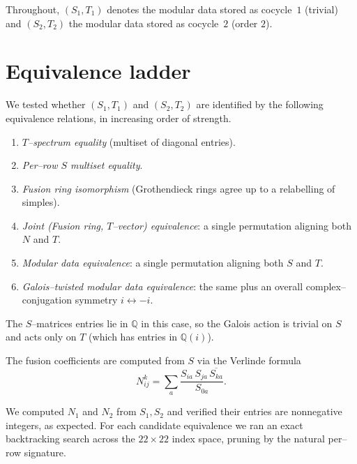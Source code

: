 \documentclass[11pt,a4paper]{amsart}
\theoremstyle{plain}
\theoremstyle{definition}
\begin{document}
Throughout, $(S_1,T_1)$ denotes the modular data stored as cocycle~$1$
(trivial) and $(S_2,T_2)$ the modular data stored as cocycle~$2$ (order
$2$).

\section{Equivalence ladder}

We tested whether $(S_1,T_1)$ and $(S_2,T_2)$ are identified by the
following equivalence relations, in increasing order of strength.

\begin{enumerate}
\item \emph{$T$--spectrum equality} (multiset of diagonal entries).
\item \emph{Per--row $S$ multiset equality}.
\item \emph{Fusion ring isomorphism} (Grothendieck rings agree up to a
       relabelling of simples).
\item \emph{Joint (Fusion ring, $T$--vector) equivalence}: a single
       permutation aligning both $N$ and $T$.
\item \emph{Modular data equivalence}: a single permutation aligning
       both $S$ and $T$.
\item \emph{Galois--twisted modular data equivalence}: the same plus an
       overall complex--conjugation symmetry $i\leftrightarrow -i$.
\end{enumerate}

The $S$--matrices entries lie in $\mathbb Q$ in this case, so the Galois
action is trivial on $S$ and acts only on $T$ (which has entries in
$\mathbb Q(i)$).

\medskip
\noindent
The fusion coefficients are computed from $S$ via the Verlinde formula
\begin{equation}
N_{ij}^k = \sum_{a} \frac{S_{ia}\,S_{ja}\,\overline{S_{ka}}}{S_{0a}}.
\label{eq:verlinde}
\end{equation}

We computed $N_1$ and $N_2$ from $S_1, S_2$ and verified their entries
are nonnegative integers, as expected. For each candidate equivalence we
ran an exact backtracking search across the $22\times 22$ index space,
pruning by the natural per--row signature.
\end{document}
